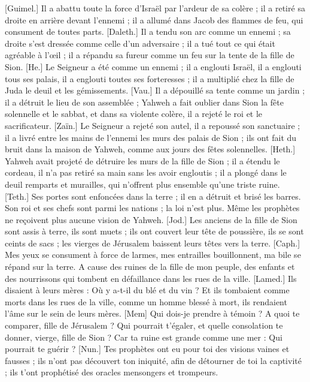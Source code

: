 \begin{multicols}{2}
[Guimel.] Il a abattu toute la force d’Israël par l’ardeur de sa colère ; il a retiré sa droite en arrière devant l’ennemi ; il a allumé dans Jacob des flammes de feu, qui consument de toutes parts.
[Daleth.] Il a tendu son arc comme un ennemi ; sa droite s'est dressée comme celle d’un adversaire ; il a tué tout ce qui était agréable à l’œil ; il a répandu sa fureur comme un feu sur la tente de la fille de Sion.
[He.] Le Seigneur a été comme un ennemi ; il a englouti Israël, il a englouti tous ses palais, il a englouti toutes ses forteresses ; il a multiplié chez la fille de Juda le deuil et les gémissements.
[Vau.] Il a dépouillé sa tente comme un jardin ; il a détruit le lieu de son assemblée ; Yahweh a fait oublier dans Sion la fête solennelle et le sabbat, et dans sa violente colère, il a rejeté le roi et le sacrificateur.
[Zaïn.] Le Seigneur a rejeté son autel, il a repoussé son sanctuaire ; il a livré entre les mains de l’ennemi les murs des palais de Sion ; ils ont fait du bruit dans la maison de Yahweh, comme aux jours des fêtes solennelles.
[Heth.] Yahweh avait projeté de détruire les murs de la fille de Sion ; il a étendu le cordeau, il n’a pas retiré sa main sans les avoir engloutis ; il a plongé dans le deuil remparts et murailles, qui n'offrent plus ensemble qu'une triste ruine.
[Teth.] Ses portes sont enfoncées dans la terre ; il en a détruit et brisé les barres. Son roi et ses chefs sont parmi les nations ; la loi n’est plus. Même les prophètes ne reçoivent plus aucune vision de Yahweh.
[Jod.] Les anciens de la fille de Sion sont assis à terre, ils sont muets ; ils ont couvert leur tête de poussière, ils se sont ceints de sacs ; les vierges de Jérusalem baissent leurs têtes vers la terre.
[Caph.] Mes yeux se consument à force de larmes, mes entrailles bouillonnent, ma bile se répand sur la terre. A cause des ruines de la fille de mon peuple, des enfants et des nourrissons qui tombent en défaillance dans les rues de la ville.
[Lamed.] Ils disaient à leurs mères : Où y a-t-il du blé et du vin ? Et ils tombaient comme morts dans les rues de la ville, comme un homme blessé à mort, ils rendaient l'âme sur le sein de leurs mères.
[Mem] Qui dois-je prendre à témoin ? A quoi te comparer, fille de Jérusalem ? Qui pourrait t'égaler, et quelle consolation te donner, vierge, fille de Sion ? Car ta ruine est grande comme une mer : Qui pourrait te guérir ?
[Nun.] Tes prophètes ont eu pour toi des visions vaines et fausses ; ils n’ont pas découvert ton iniquité, afin de détourner de toi la captivité ; ils t’ont prophétisé des oracles mensongers et trompeurs.

\end{multicols}
